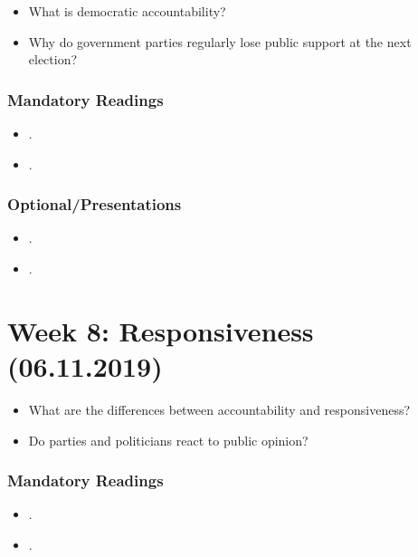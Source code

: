 \documentclass[abstract=on,parskip=full,headings=standardclasses,fontsize=11pt,paper=a4]{scrartcl}
\begin{document}
\begin{itemize}
\renewcommand\labelitemi{--}
\item What is democratic accountability?
\item Why do government parties  regularly lose public support at the next election?
\end{itemize}

\subsubsection*{Mandatory Readings}

\begin{itemize}
\item {}.
\item {}.
\end{itemize}


\subsubsection*{Optional/Presentations}
\begin{itemize}
\item {}.
\item {}.
\end{itemize}

 
 

\section{Week 8:  Responsiveness (06.11.2019)}



\begin{itemize}
\renewcommand\labelitemi{--}
\item What are the differences between accountability and responsiveness?
\item Do parties and politicians react to public opinion? 
\end{itemize}

\subsubsection*{Mandatory Readings}
\begin{itemize}
\item {}.
\item {}.
\end{itemize}
\end{document}
